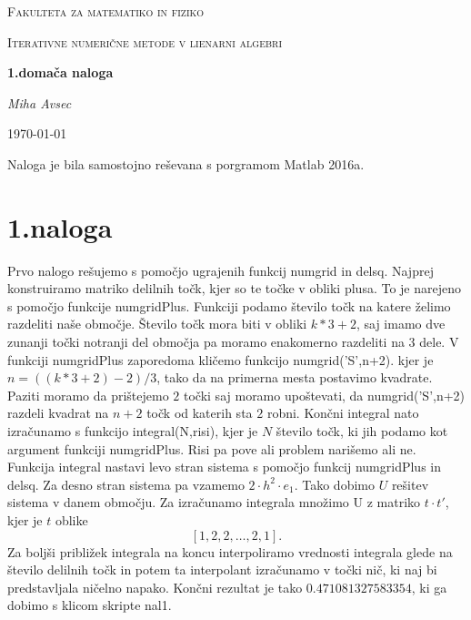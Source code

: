 \documentclass[11pt]{article} %
\begin{document}
\begin{titlepage}
	\centering
	{\scshape\LARGE Fakulteta za matematiko in fiziko \par}
	\vspace{1cm}
	{\scshape\Large Iterativne numerične metode v lienarni algebri\par}
	\vspace{1.5cm}
	{\huge\bfseries 1.domača naloga\par}
	\vspace{2cm}
	{\Large\itshape Miha Avsec\par}
	\vfill

	\vfill

	{\large \today\par}
\end{titlepage}

Naloga je bila samostojno reševana s porgramom Matlab 2016a.

\section{1.naloga}

Prvo nalogo rešujemo s pomočjo ugrajenih funkcij numgrid in delsq. Najprej konstruiramo matriko delilnih točk, kjer so te točke v obliki plusa. To je narejeno s pomočjo funkcije numgridPlus.
Funkciji podamo število točk na katere želimo razdeliti naše območje. Število točk mora biti v obliki $k*3 +2$, saj imamo dve zunanji točki notranji del območja pa moramo enakomerno razdeliti na $3$ dele. V funkciji numgridPlus zaporedoma kličemo funkcijo numgrid('S',n+2). kjer je $n = ((k*3+2)-2)/3$, tako da na primerna mesta postavimo kvadrate. Paziti moramo da prištejemo $2$ točki saj moramo upoštevati, da numgrid('S',n+2) razdeli kvadrat na $n+2$ točk od katerih sta $2$ robni. Končni integral nato izračunamo s funkcijo integral(N,risi), kjer je $N$ število točk, ki jih podamo kot argument funkciji numgridPlus. Risi pa pove ali problem narišemo ali ne. Funkcija integral nastavi levo stran sistema s pomočjo funkcij numgridPlus in delsq. Za desno stran sistema pa vzamemo $2\cdot h^2 \cdot e_1$. Tako dobimo $U$ rešitev sistema v danem območju. Za izračunamo integrala množimo U z matriko $t\cdot t'$, kjer je $t$ oblike
$$[1,2,2, \ldots, 2,1].$$
 Za boljši približek integrala na koncu interpoliramo vrednosti integrala glede na število delilnih točk in potem ta interpolant izračunamo v točki nič, ki naj bi predstavljala ničelno napako. Končni rezultat je tako $0.471081327583354$, ki ga dobimo s klicom skripte nal1.
\end{document}
